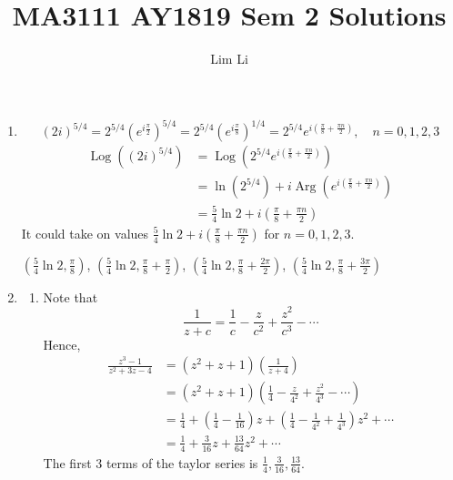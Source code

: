 \documentclass{article}
\title{MA3111 AY1819 Sem 2 Solutions}
\author{Lim Li}
\newcommand{\paren}[1]{\left(#1\right)}
\DeclareMathOperator{\Arg}{Arg}
\DeclareMathOperator{\Log}{Log}
\begin{document}
\maketitle
\begin{enumerate}
\item
\[(2i)^{5/4} = 2^{5/4}(e^{i\frac{\pi}{2}})^{5/4} = 2^{5/4} (e^{i\frac{\pi}{8}})^{1/4} = 2^{5/4} e^{i(\frac{\pi}{8} + \frac{\pi n}{2})}, \quad n=0,1,2,3\]
\begin{align*}
\Log ((2i)^{5/4}) &= \Log(2^{5/4} e^{i(\frac{\pi}{8} + \frac{\pi n}{2})}) \\
    &= \ln(2^{5/4}) + i\Arg(e^{i(\frac{\pi}{8} + \frac{\pi n}{2})}) \\
    &= \frac{5}{4} \ln 2 + i (\frac{\pi}{8} + \frac{\pi n}{2})
\end{align*}
It could take on values $\frac{5}{4} \ln 2 + i (\frac{\pi}{8} + \frac{\pi n}{2})$ for $n=0,1,2,3$.

$(\frac{5}{4} \ln 2 , \frac{\pi}{8})$, $(\frac{5}{4} \ln 2 , \frac{\pi}{8} + \frac{\pi}{2})$, $(\frac{5}{4} \ln 2 , \frac{\pi}{8} + \frac{2\pi}{2})$, $(\frac{5}{4} \ln 2 , \frac{\pi}{8} + \frac{3\pi}{2})$
\item
\begin{enumerate}
\item Note that
\[\frac{1}{z+c} = \frac{1}{c} - \frac{z}{c^2} + \frac{z^2}{c^3} - \cdots\]
Hence,
\begin{align*}
\frac{z^3-1}{z^2+3z-4} &= (z^2+z+1)\paren{\frac{1}{z+4}} \\
    &= (z^2+z+1)\paren{\frac{1}{4} - \frac{z}{4^2} + \frac{z^2}{4^3} - \cdots} \\
    &= \frac{1}{4} + (\frac{1}{4} - \frac{1}{16})z + (\frac{1}{4} - \frac{1}{4^2} + \frac{1}{4^3})z^2 + \cdots \\
    &= \frac{1}{4} + \frac{3}{16} z + \frac{13}{64} z^2 + \cdots
\end{align*}
The first 3 terms of the taylor series is $\frac{1}{4}, \frac{3}{16}, \frac{13}{64}$.


\end{enumerate}
\end{enumerate}
\end{document}
